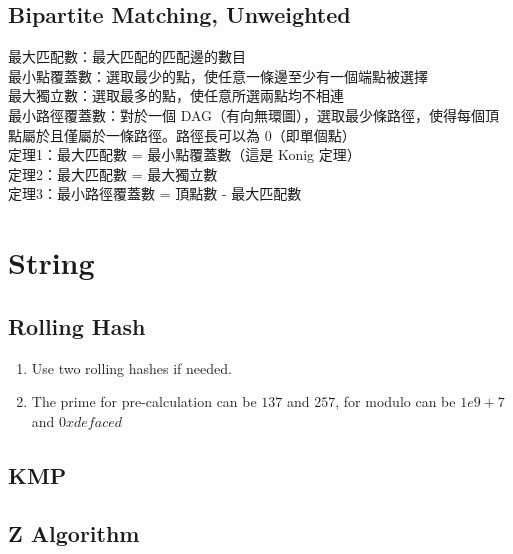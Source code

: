 \documentclass[10pt,oneside]{article}
\begin{document}
\begin{landscape}
\begin{multicols}{2}
\subsection{Bipartite Matching, Unweighted}

{\normalsize
最大匹配數：最大匹配的匹配邊的數目\\
最小點覆蓋數：選取最少的點，使任意一條邊至少有一個端點被選擇\\
最大獨立數：選取最多的點，使任意所選兩點均不相連\\
最小路徑覆蓋數：對於一個 DAG（有向無環圖），選取最少條路徑，使得每個頂點屬於且僅屬於一條路徑。路徑長可以為 0（即單個點）\\
定理1：最大匹配數 = 最小點覆蓋數（這是 Konig 定理）\\
定理2：最大匹配數 = 最大獨立數\\
定理3：最小路徑覆蓋數 = 頂點數 - 最大匹配數\\
}



\section{String}

\subsection{Rolling Hash}

{\normalsize 
\begin{enumerate}
	\item Use two rolling hashes if needed.  
	\item The prime for pre-calculation can be $137$ and $257$, for modulo can be $1e9 + 7$ and $0xdefaced$ 
\end{enumerate}
}


\subsection{KMP}


\subsection{Z Algorithm}


\end{multicols}
\end{landscape}
\end{document}
